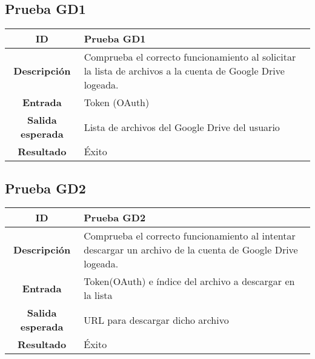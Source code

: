 \documentclass{scrartcl}
\begin{document}
\subsection{Prueba GD1}

\begin{tabularx}{14cm}{|c|X|}
	\hline \textbf{ID} & Prueba GD1 \\ 
	\hline \textbf{Descripción} & Comprueba el correcto funcionamiento al solicitar la lista de archivos a la cuenta de Google Drive logeada. \\	 
	\hline  \textbf{Entrada}		& Token (OAuth) \\ 
	\hline  \textbf{Salida esperada}			& Lista de archivos del Google Drive del usuario \\
	\hline  \textbf{Resultado}			& Éxito	 \\
	\hline 
\end{tabularx} 

\subsection{Prueba GD2}

\begin{tabularx}{14cm}{|c|X|}
	\hline \textbf{ID} & Prueba GD2 \\ 
	\hline \textbf{Descripción} & Comprueba el correcto funcionamiento al intentar descargar un archivo de la cuenta de Google Drive logeada.\\	 
	\hline  \textbf{Entrada}		& Token(OAuth) e índice del archivo a descargar en la lista \\ 
	\hline  \textbf{Salida esperada}			& URL para descargar dicho archivo \\
	\hline  \textbf{Resultado}			& Éxito \\
	\hline 
\end{tabularx} 
\end{document}
